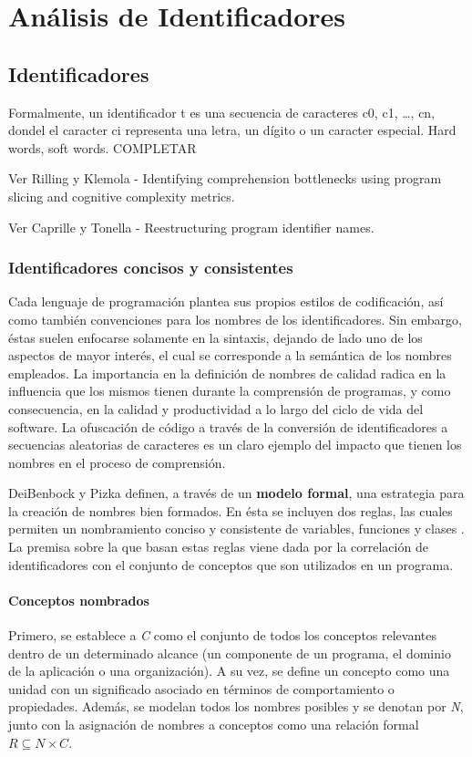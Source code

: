 \chapter{Análisis de Identificadores}

\section{Identificadores}
Formalmente, un identificador t es una secuencia de caracteres c0, c1, …, cn, dondel el caracter ci representa una letra, un dígito o un caracter especial. Hard words, soft words. COMPLETAR

Ver Rilling y Klemola - Identifying comprehension bottlenecks using program slicing and cognitive complexity metrics.

Ver Caprille y Tonella - Reestructuring program identifier names.

\subsection{Identificadores concisos y consistentes}
Cada lenguaje de programación plantea sus propios estilos de codificación, así como también convenciones para los nombres de los identificadores. Sin embargo, éstas suelen enfocarse solamente en la sintaxis, dejando de lado uno de los aspectos de mayor interés, el cual se corresponde a la semántica de los nombres empleados. La importancia en la definición de nombres de calidad radica en la influencia que los mismos tienen durante la comprensión de programas, y como consecuencia, en la calidad y productividad a lo largo del ciclo de vida del software. La ofuscación de código a través de la conversión de identificadores a secuencias aleatorias de caracteres es un claro ejemplo del impacto que tienen los nombres en el proceso de comprensión.

DeiBenbock y Pizka definen, a través de un \textbf{modelo formal}, una estrategia para la creación de nombres bien formados. En ésta se incluyen dos reglas, las cuales permiten un nombramiento conciso y consistente de variables, funciones y clases \cite{DeiBenbockPizka05}. La premisa sobre la que basan estas reglas viene dada por la correlación de identificadores con el conjunto de conceptos que son utilizados en un programa.

\subsubsection{Conceptos nombrados}
Primero, se establece a \textit{C} como el conjunto de todos los conceptos relevantes dentro de un determinado alcance (un componente de un programa, el dominio de la aplicación o una organización). A su vez, se define un concepto como una unidad con un significado asociado en términos de comportamiento o propiedades. Además, se modelan todos los nombres posibles y se denotan por \textit{N}, junto con la asignación de nombres a conceptos como una relación formal $R \subseteq N \times C$.

